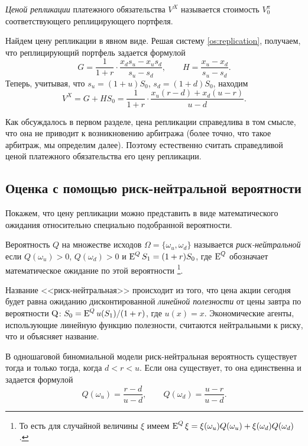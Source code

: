 \begin{definition}
\emph{Ценой репликации} платежного обязательства $V^X$ называется стоимость $V^\pi_0$ соответствующего реплицирующего портфеля. 
\end{definition}

Найдем цену репликации в явном виде.
Решая систему \eqref{os:replication}, получаем, что реплицирующий портфель задается формулой
\label{os:replication-portfolio}
\[
G = \frac{1}{1+r} \cdot \frac{x_d s_u - x_us_d}{s_u - s_d}, \qquad
H = \frac{x_u-x_d}{s_u-s_d}.
\]
Теперь, учитывая, что $s_u = (1+u)S_0$, $s_d = (1+d)S_0$, находим
\[
V^X = G + HS_0 = \frac{1}{1+r}\cdot \frac{x_u(r-d) + x_d(u-r)}{u-d}.
\]

Как обсуждалось в первом разделе, цена репликации справедлива в том смысле, что она не приводит к возникновению арбитража (более точно, что такое арбитраж, мы определим далее). Поэтому естественно считать справедливой ценой платежного обязательства его цену репликации.


\subsection{Оценка с помощью риск-нейтральной вероятности}

Покажем, что цену репликации можно представить в виде математического ожидания относительно специально подобранной вероятности.

\begin{definition}
Вероятность $Q$ на множестве исходов $\Omega=\{\omega_u,\omega_d\}$ называется \emph{риск-нейтральной} если $Q(\omega_u) > 0$, $Q(\omega_d) > 0$ и $\operatorname{E}^Q {S_1}= (1+r)S_0$, где $\operatorname{E}^Q$ обозначает математическое ожидание по этой вероятности%
\footnote{То есть для случайной величины $\xi$ имеем $\operatorname{E}^Q \xi = \xi(\omega_u) Q(\omega_u) + \xi(\omega_d) Q(\omega_d)$.}.
\end{definition}

Название <<риск-нейтральная>> происходит из того, что цена акции сегодня будет равна ожиданию дисконтированной \emph{линейной полезности} от цены завтра по вероятности $\mathrm{Q}$: $S_0 = \operatorname{E}^Q u(S_1)/(1+r)$, где $u(x) = x$.
Экономические агенты, использующие линейную функцию полезности, считаются нейтральными к риску, что и объясняет название.

\begin{proposition}
\label{os:t:emm}
В одношаговой биномиальной модели риск-нейтральная вероятность существует тогда и только тогда, когда $d<r<u$.
Если она существует, то она единственна и задается формулой
\[
Q(\omega_u) = \frac{r-d}{u-d}, \qquad
Q(\omega_d) = \frac{u-r}{u-d}.
\]
\end{proposition}

